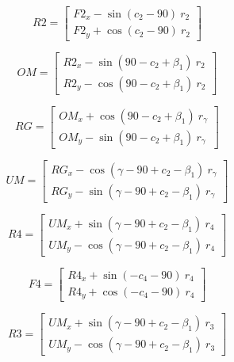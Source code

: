 \documentclass[10pt,a4paper]{article}
\begin{document}
\begin{multicols}{2}
\begin{equation}
R2 = \begin{bmatrix}
F2_x - \sin(c_2 - 90)~r_2 \\
F2_y + \cos(c_2 - 90)~r_2
\end{bmatrix}
\end{equation}

\begin{equation}
OM = \begin{bmatrix}
R2_x - \sin(90- c_2 + \beta_1)~r_2 \\
R2_y - \cos(90- c_2 + \beta_1)~r_2
\end{bmatrix}
\end{equation}

\begin{equation}
RG = \begin{bmatrix}
OM_x + \cos(90- c_2 + \beta_1)~r_\gamma \\
OM_y - \sin(90- c_2 + \beta_1)~r_\gamma
\end{bmatrix}
\end{equation}

\begin{equation}
UM = \begin{bmatrix}
RG_x - \cos(\gamma - 90 + c_2 - \beta_1)~r_\gamma \\
RG_y - \sin(\gamma - 90 + c_2 - \beta_1)~r_\gamma
\end{bmatrix}
\end{equation}

\begin{equation}
R4 = \begin{bmatrix}
UM_x + \sin(\gamma - 90 + c_2 - \beta_1)~r_4 \\
UM_y - \cos(\gamma - 90 + c_2 - \beta_1)~r_4
\end{bmatrix}
\end{equation}

\begin{equation}
F4 = \begin{bmatrix}
R4_x + \sin(-c_4 -90)~r_4 \\
R4_y + \cos(-c_4 -90)~r_4
\end{bmatrix}
\end{equation}

\begin{equation}
R3 = \begin{bmatrix}
UM_x + \sin(\gamma - 90 + c_2 - \beta_1)~r_3 \\
UM_y - \cos(\gamma - 90 + c_2 - \beta_1)~r_3
\end{bmatrix}
\end{equation}


\end{multicols}
\end{document}
